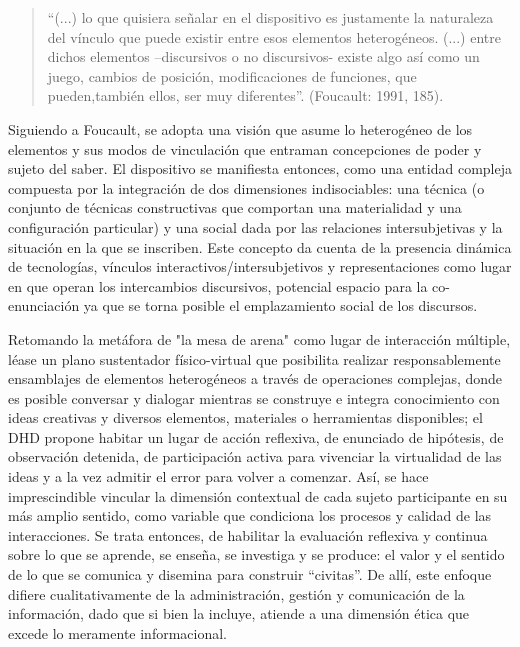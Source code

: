      
\begin{quote} 
      “(...) lo que quisiera señalar en el dispositivo es justamente la
      naturaleza del vínculo que puede existir entre esos elementos
      heterogéneos. (...) entre dichos elementos –discursivos o no
      discursivos- existe algo así como un juego, cambios de posición,
      modificaciones de funciones, que pueden,también ellos, ser muy
      diferentes”. (Foucault: 1991, 185).
\end{quote} 

Siguiendo a Foucault, se adopta una visión que asume lo heterogéneo de los
elementos y sus modos de vinculación que entraman concepciones de
poder y sujeto del saber. El dispositivo se manifiesta entonces, como una
entidad compleja compuesta por la integración de dos dimensiones
indisociables: una técnica (o conjunto de técnicas constructivas que
comportan una materialidad y una configuración particular) y una social
dada por las relaciones intersubjetivas y la situación en la que se
inscriben. Este concepto da cuenta de la presencia dinámica de tecnologías, vínculos
interactivos/intersubjetivos y representaciones como lugar en que operan los
intercambios discursivos, potencial espacio para la co-enunciación ya
que se torna posible el emplazamiento social de los discursos.
\label{intersubjetivas}

Retomando la metáfora de "la mesa de arena" como lugar de interacción múltiple,
léase un plano sustentador físico-virtual que posibilita realizar
responsablemente ensamblajes de elementos heterogéneos a través de operaciones
complejas, donde es posible conversar y dialogar mientras se construye e integra
conocimiento con ideas creativas y diversos elementos, materiales o herramientas
disponibles; el DHD propone habitar un lugar de acción reflexiva, de enunciado
de hipótesis, de observación detenida, de participación activa para vivenciar
la virtualidad de las ideas y a la vez admitir el error para volver a comenzar.
Así, se hace imprescindible vincular la dimensión contextual de cada sujeto
participante en su más amplio sentido, como variable que condiciona los procesos
y calidad de las interacciones. Se trata entonces, de habilitar la evaluación
reflexiva y continua sobre lo que se aprende, se enseña, se investiga y se
produce: el valor y el sentido de lo que se comunica y disemina para construir
“civitas”. De allí, este enfoque difiere cualitativamente de la administración,
gestión y comunicación de la información, dado que si bien la incluye, atiende a
una dimensión ética que excede lo meramente informacional.

